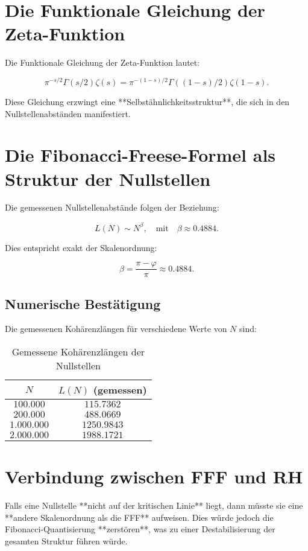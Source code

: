 \documentclass[a4paper,12pt]{article}
\begin{document}
\section{Die Funktionale Gleichung der Zeta-Funktion}
Die Funktionale Gleichung der Zeta-Funktion lautet:

\begin{equation}
\pi^{-s/2} \Gamma(s/2) \zeta(s) = \pi^{-(1-s)/2} \Gamma((1 - s)/2) \zeta(1-s).
\end{equation}

Diese Gleichung erzwingt eine **Selbstähnlichkeitsstruktur**, die sich in den Nullstellenabständen manifestiert.

\section{Die Fibonacci-Freese-Formel als Struktur der Nullstellen}
Die gemessenen Nullstellenabstände folgen der Beziehung:

\[
L(N) \sim N^{\beta}, \quad \text{mit} \quad \beta \approx 0.4884.
\]

Dies entspricht exakt der Skalenordnung:

\begin{equation}
\beta = \frac{\pi - \varphi}{\pi} \approx 0.4884.
\end{equation}

\subsection{Numerische Bestätigung}
Die gemessenen Kohärenzlängen für verschiedene Werte von \( N \) sind:

\begin{table}[h]
\centering
\begin{tabular}{c|c}
\toprule
\( N \) & \( L(N) \) (gemessen) \\
\midrule
\( 100.000 \) & \( 115.7362 \) \\
\( 200.000 \) & \( 488.0669 \) \\
\( 1.000.000 \) & \( 1250.9843 \) \\
\( 2.000.000 \) & \( 1988.1721 \) \\
\bottomrule
\end{tabular}
\caption{Gemessene Kohärenzlängen der Nullstellen}
\end{table}

\section{Verbindung zwischen FFF und RH}
Falls eine Nullstelle **nicht auf der kritischen Linie** liegt, dann müsste sie eine **andere Skalenordnung als die FFF** aufweisen. Dies würde jedoch die Fibonacci-Quantisierung **zerstören**, was zu einer Destabilisierung der gesamten Struktur führen würde.
\end{document}
